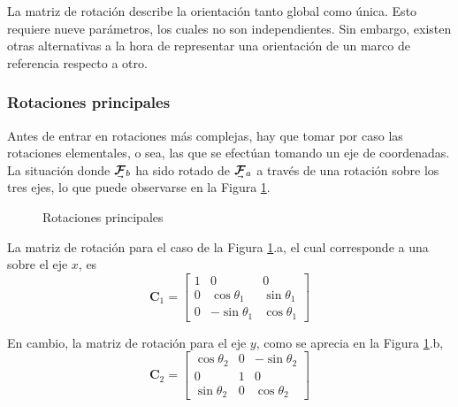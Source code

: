 La matriz de rotación describe la orientación tanto global como única. Esto requiere nueve parámetros, los cuales no son independientes. Sin embargo, existen otras alternativas a la hora de representar una orientación de un marco de referencia respecto a otro.

\subsubsection{Rotaciones principales}
Antes de entrar en rotaciones más complejas, hay que tomar por caso las rotaciones elementales, o sea, las que se efectúan tomando un eje de coordenadas. La situación donde $\undervec{\bm{\mathcal{F}}}_b$ ha sido rotado de $\undervec{\bm{\mathcal{F}}}_a$ a través de una rotación sobre los tres ejes, lo que puede observarse en la Figura \ref{fig:rotations}.


\begin{figure}
    \centering
    \quad
    \quad
    \caption{Rotaciones principales}
    \quad
    \label{fig:rotations}
\end{figure}

La matriz de rotación para el caso de la Figura \ref{fig:rotations}.a, el cual corresponde a una sobre el eje $x$, es
\begin{equation}
    \bm{C}_1 = 
    \begin{bmatrix}
        1 & 0 & 0 \\
        0 & \cos \theta_1 & \sin \theta_1 \\
        0 & -\sin \theta_1 & \cos \theta_1
    \end{bmatrix}
\end{equation}

En cambio, la matriz de rotación para el eje $y$, como se aprecia en la Figura \ref{fig:rotations}.b,
\begin{equation}
    \bm{C}_2 = 
    \begin{bmatrix}
        \cos \theta_2 & 0 & - \sin \theta_2 \\
        0 & 1 & 0 \\
        \sin \theta_2 & 0 & \cos \theta_2
    \end{bmatrix}
\end{equation}

